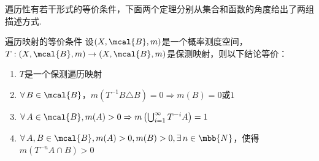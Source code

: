 遍历性有若干形式的等价条件，下面两个定理分别从集合和函数的角度给出了两组描述方式.
\begin{theorem}{遍历映射的等价条件}\label{thm:2.4}
    \wideline
    设$(X,\mcal{B},m)$是一个概率测度空间，$T:(X,\mcal{B},m)\to(X,\mcal{B},m)$是保测映射，则以下结论等价：
    \begin{enumerate}[(1)]
        \item $T$是一个保测遍历映射
        \item $\forall\, B\in\mcal{B}$，$m \left(T^{-1}B\triangle B\right)=0 \Rightarrow m(B)=0\text{或}1$
        \item $\forall\, A\in\mcal{B},m(A)>0 \Rightarrow m \left(\bigcup_{i=1}^\infty{T^{-i}A}\right)=1$
        \item $\forall\, A,B\in\mcal{B},m(A)>0,m(B)>0,\exists\,n\in\mbb{N}$，使得$m \left(T^{-n}A\cap B\right)>0$
    \end{enumerate}
\end{theorem}

